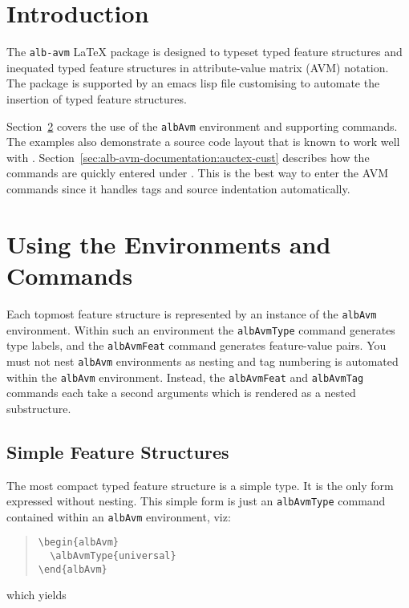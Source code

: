 \documentclass[11pt,a4paper,oneside,titlepage]{alb-corp}
\begin{document}

\section{Introduction}
\label{sec:alb-avm-documentation:intr}

The \texttt{alb-avm} \LaTeX{} package is designed to typeset typed
feature structures and inequated typed feature structures in
attribute-value matrix (AVM) notation.  The package is supported by an
emacs lisp file customising \AUCTeX{} to automate the insertion of typed
feature structures.

Section~\ref{sec:alb-avm-documentation:using-envir-comm} covers the use
of the \texttt{albAvm} environment and supporting commands.  The
examples also demonstrate a source code layout that is known to work
well with \AUCTeX{}.
Section~\ref{sec:alb-avm-documentation:auctex-cust} describes how the
commands are quickly entered under \AUCTeX{}.  This is the best way to
enter the AVM commands since it handles tags and source indentation
automatically.




\section{Using the Environments and Commands}
\label{sec:alb-avm-documentation:using-envir-comm}

Each topmost feature structure is represented by an instance of the
\texttt{albAvm} environment.  Within such an environment the
\texttt{albAvmType} command generates type labels, and the
\texttt{albAvmFeat} command generates feature-value pairs.  You must not
nest \texttt{albAvm} environments as nesting and tag numbering is
automated within the \texttt{albAvm} environment.  Instead, the
\texttt{albAvmFeat} and \texttt{albAvmTag} commands each take a second
arguments which is rendered as a nested substructure.



\subsection{Simple Feature Structures}
\label{sec:alb-avm-documentation:simple-feat-struct}

The most compact typed feature structure is a simple type.  It is the
only form expressed without nesting.  This simple form is just an
\texttt{albAvmType} command contained within an \texttt{albAvm}
environment, viz:
\begin{quote}
\begin{verbatim}
\begin{albAvm}
  \albAvmType{universal}
\end{albAvm}
\end{verbatim}
\end{quote}
which yields
\begin{quote}
  \begin{albAvm}
  \end{albAvm}
\end{quote}
\end{document}
